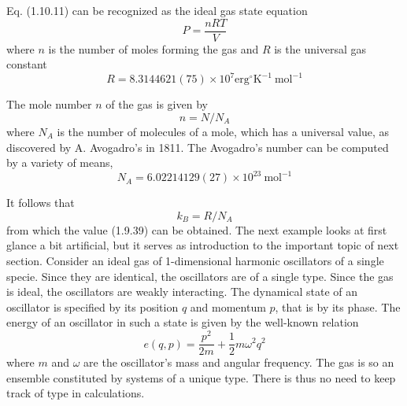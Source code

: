 \documentclass{article}
\begin{document}
Eq. (1.10.11) can be recognized as the ideal gas state equation
$$
\begin{equation*}
P=\frac{n R T}{V} \tag{1.10.12}
\end{equation*}
$$
where $n$ is the number of moles forming the gas and $R$ is the universal gas constant
$$
\begin{equation*}
R=8.3144621(75) \times 10^{7} \mathrm{erg}^{\circ} \mathrm{K}^{-1} \mathrm{~mol}^{-1} \tag{1.10.13}
\end{equation*}
$$


The mole number $n$ of the gas is given by
$$
\begin{equation*}
n=N / N_{A} \tag{1.10.14}
\end{equation*}
$$
where $N_{A}$ is the number of molecules of a mole, which has a universal value, as discovered by A. Avogadro's in 1811. The Avogadro's number can be computed by a variety of means,
$$
\begin{equation*}
N_{A}=6.02214129(27) \times 10^{23} \mathrm{~mol}^{-1} \tag{1.10.15}
\end{equation*}
$$

It follows that
$$
\begin{equation*}
k_{B}=R / N_{A} \tag{1.10.16}
\end{equation*}
$$
from which the value (1.9.39) can be obtained.
The next example looks at first glance a bit artificial, but it serves as introduction to the important topic of next section. Consider an ideal gas of 1-dimensional harmonic oscillators of a single specie. Since they are identical, the oscillators are of a single type. Since the gas is ideal, the oscillators are weakly interacting. The dynamical state of an oscillator is specified by its position $q$ and momentum $p$, that is by its phase. The energy of an oscillator in such a state is given by the well-known relation
$$
\begin{equation*}
e(q, p)=\frac{p^{2}}{2 m}+\frac{1}{2} m \omega^{2} q^{2} \tag{1.10.17}
\end{equation*}
$$
where $m$ and $\omega$ are the oscillator's mass and angular frequency. The gas is so an ensemble constituted by systems of a unique type. There is thus no need to keep track of type in calculations.
\end{document}

